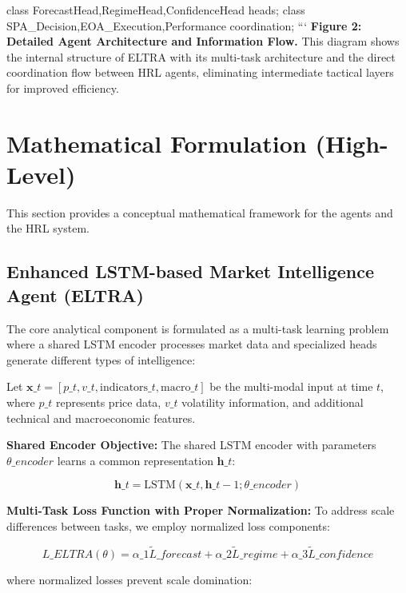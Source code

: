\documentclass[11pt,a4paper]{article}
\begin{document}
    class ForecastHead,RegimeHead,ConfidenceHead heads;
    class SPA\_Decision,EOA\_Execution,Performance coordination;
```
\textbf{Figure 2: Detailed Agent Architecture and Information Flow.} This diagram shows the internal structure of ELTRA with its multi-task architecture and the direct coordination flow between HRL agents, eliminating intermediate tactical layers for improved efficiency.

\section{Mathematical Formulation (High-Level)}

This section provides a conceptual mathematical framework for the agents and the HRL system.

\subsection{Enhanced LSTM-based Market Intelligence Agent (ELTRA)}

The core analytical component is formulated as a multi-task learning problem where a shared LSTM encoder processes market data and specialized heads generate different types of intelligence:

Let $\mathbf{x}\_t = [p\_t, v\_t, \text{indicators}\_t, \text{macro}\_t]$ be the multi-modal input at time $t$, where $p\_t$ represents price data, $v\_t$ volatility information, and additional technical and macroeconomic features.

\textbf{Shared Encoder Objective:}
The shared LSTM encoder with parameters $\theta\_{encoder}$ learns a common representation $\mathbf{h}\_t$:

\begin{equation}
\mathbf{h}\_t = \text{LSTM}(\mathbf{x}\_t, \mathbf{h}\_{t-1}; \theta\_{encoder})
\end{equation}

\textbf{Multi-Task Loss Function with Proper Normalization:}
To address scale differences between tasks, we employ normalized loss components:

\begin{equation}
L\_{ELTRA}(\theta) = \alpha\_1 \tilde{L}\_{forecast} + \alpha\_2 \tilde{L}\_{regime} + \alpha\_3 \tilde{L}\_{confidence}
\end{equation}

where normalized losses prevent scale domination:
\end{document}
